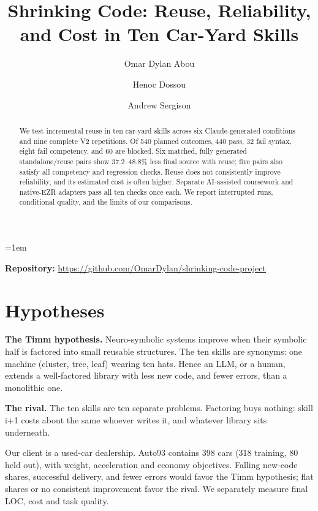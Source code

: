 \documentclass[sigconf,nonacm]{acmart}
\begin{document}
\emergencystretch=1em
\title{Shrinking Code: Reuse, Reliability, and Cost in Ten Car-Yard Skills}
\author{Omar Dylan Abou}
\author{Henoc Dossou}
\author{Andrew Sergison}
\renewcommand{\shortauthors}{Abou, Dossou, and Sergison}
\begin{abstract}
We test incremental reuse in ten car-yard skills across six Claude-generated conditions and nine complete V2 repetitions. Of 540 planned outcomes, 440 pass, 32 fail syntax, eight fail competency, and 60 are blocked. Six matched, fully generated standalone/reuse pairs show 37.2--48.8\% less final source with reuse; five pairs also satisfy all competency and regression checks. Reuse does not consistently improve reliability, and its estimated cost is often higher. Separate AI-assisted coursework and native-EZR adapters pass all ten checks once each. We report interrupted runs, conditional quality, and the limits of our comparisons.
\end{abstract}
\maketitle
\noindent\textbf{Repository:} \url{https://github.com/OmarDylan/shrinking-code-project}
\section{Hypotheses}
\textbf{The Timm hypothesis.} Neuro-symbolic systems improve when their symbolic half is factored into small reusable structures. The ten skills are synonyms: one machine (cluster, tree, leaf) wearing ten hats. Hence an LLM, or a human, extends a well-factored library with less new code, and fewer errors, than a monolithic one.

\textbf{The rival.} The ten skills are ten separate problems. Factoring buys nothing: skill i+1 costs about the same whoever writes it, and whatever library sits underneath.\cite{course}

Our client is a used-car dealership. Auto93 contains 398 cars (318 training, 80 held out), with weight, acceleration and economy objectives. Falling new-code shares, successful delivery, and fewer errors would favor the Timm hypothesis; flat shares or no consistent improvement favor the rival. We separately measure final LOC, cost and task quality.
\end{document}
